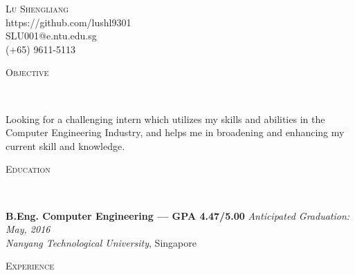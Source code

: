 \documentclass[9pt]{article}
\newenvironment{changemargin}[2]{%
  \begin{list}{}{%
      \setlength{\topsep}{0pt}%
      \setlength{\leftmargin}{#1}%
      \setlength{\rightmargin}{#2}%
      \setlength{\listparindent}{\parindent}%
      \setlength{\itemindent}{\parindent}%
      \setlength{\parsep}{\parskip}%
    }%
  \item[]}{\end{list}
}
\newcommand{\lineover}{
  \begin{changemargin}{-0.05in}{-0.05in}
    \vspace*{-8pt}
    \hrulefill \\
    \vspace*{-2pt}
  \end{changemargin}
}
\newcommand{\header}[1]{
  \begin{changemargin}{-0.5in}{-0.5in}
    \scshape{#1}\\
    \lineover
  \end{changemargin}
}
\newcommand{\contact}[4]{
  \begin{changemargin}{-0.5in}{-0.5in}
    \begin{center}
      {\Large \scshape {#1}}\\ \smallskip
      {#2}\\ \smallskip 
      {#3}\\ \smallskip
      {#4}\smallskip
    \end{center}
  \end{changemargin}
}
\newenvironment{body}
{
\vspace*{-16pt}
\begin{changemargin}{-0.25in}{-0.5in}
}	
{
\end{changemargin}
}
\begin{document}
\contact{Lu Shengliang}{https://github.com/lushl9301}{SLU001@e.ntu.edu.sg}{(+65) 9611-5113}


\header{Objective}

\begin{body}
  \vspace{14pt}
Looking for a challenging intern which utilizes my skills and abilities in the Computer Engineering Industry, and helps me in broadening and enhancing my current skill and knowledge.
\end{body}

\smallskip


\header{Education}

\begin{body}
  \vspace{14pt}
  \textbf{B.Eng. Computer Engineering --- GPA 4.47/5.00} \hfill \emph{Anticipated Graduation: May, 2016} \\
  \emph{Nanyang Technological University}, Singapore\\
\end{body}

\smallskip


\header{Experience}
\end{document}
